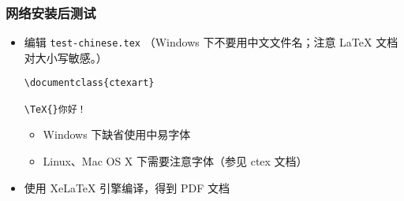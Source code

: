 \begin{frame}[fragile]
  \frametitle{网络安装后测试}

  \begin{itemize}
    \item 编辑 \texttt{test-chinese.tex} （Windows 下不要用中文文件名；注意
      \LaTeX{} 文档对大小写敏感。）
      \begin{center}
        \begin{verbatim}
\documentclass{ctexart}

\TeX{}你好！

        \end{verbatim}
      \end{center}
      \begin{itemize}
        \item Windows 下缺省使用中易字体
        \item Linux、Mac OS X 下需要注意字体（参见 ctex 文档）
      \end{itemize}
    \item 使用 XeLaTeX 引擎编译，得到 PDF 文档
      \begin{center}
      \end{center}
  \end{itemize}
\end{frame}

